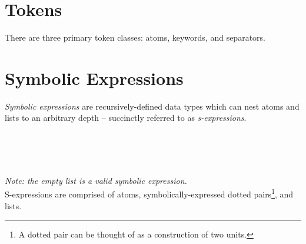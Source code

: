 \documentclass[
a4paper, %
11pt, %
onecolumn, %
openany, %
]{memoir}
\begin{document}
\section{Tokens}
\noindent There are three primary token classes: atoms, keywords, and separators. 

\section{Symbolic Expressions}
\noindent \textit{Symbolic expressions} are recursively-defined data types which can nest atoms and lists to an arbitrary depth -- succinctly referred to as \textit{s-expressions}. 
\begin{bnf*}
\\
\\
\\
\end{bnf*}
\noindent\textit{Note: the empty list is a valid symbolic expression.}\\

\noindent S-expressions are comprised of atoms, symbolically-expressed dotted pairs\footnote{A dotted pair can be thought of as a construction of two units.}, and lists. 
\end{document}
